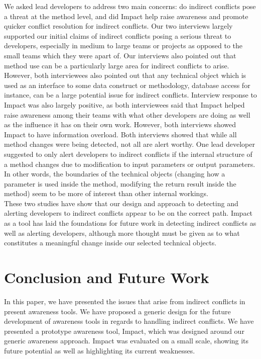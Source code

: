 \documentclass[conference]{IEEEtran}
\begin{document}
We asked lead developers to address two main concerns: do indirect
conflicts pose a threat at the method level, and did Impact help raise
awareness and promote quicker conflict resolution for indirect
conflicts. Our two interviews largely supported our initial claims of
indirect conflicts posing a serious threat to developers, especially
in medium to large teams or projects as opposed to the small
teams which they were apart of. Our interviews also pointed
out that method use can be a particularly large area for indirect
conflicts to arise. However, both interviewees also pointed out that
any technical object which is used as an interface to some data
construct or methodology, database access for instance, can be 
a large potential issue for indirect conflicts.  Interview response to
Impact was also largely positive, as both interviewees said that Impact
helped raise awareness among their teams with what other developers
are doing as well as the influence it has on their own work. However,
both interviews showed Impact to have information overload. Both
interviews showed that while all method changes were being detected,
not all are alert worthy. One lead developer suggested to only alert
developers to indirect conflicts if the internal structure of a method
changes due to modification to input parameters or output parameters.
In other words, the boundaries of the technical objects (changing
how a parameter is used inside the method, modifying the return
result inside the method) seem to be more of interest than other 
internal workings.\\

These two studies have show that our design and approach to
detecting and alerting developers to indirect conflicts appear
to be on the correct path. Impact as a tool has laid the foundations
for future work in detecting indirect conflicts as well as alerting
developers, although more thought must be given as to 
what constitutes a meaningful change inside our selected 
technical objects.\\


\section{Conclusion and Future Work}
In this paper, we have presented the issues that arise from indirect 
conflicts in present awareness tools. We have proposed a generic 
design for the future development of awareness tools in regards to
handling indirect conflicts. We have presented a prototype 
awareness tool, Impact, which was designed around our generic 
awareness approach. Impact was evaluated on a small scale, showing
its future potential as well as highlighting its current weaknesses.\\
\end{document}
